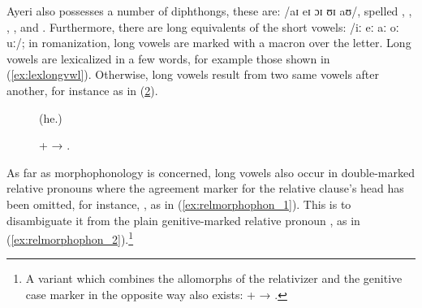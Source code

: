 Ayeri also possesses a number of diphthongs, these are: 
/aɪ eɪ ɔɪ ʊɪ aʊ/, spelled , , , , and 
. Furthermore, there are long equivalents of the short vowels: /iː eː 
aː oː uː/; in romanization, long vowels are marked with a macron 
 over the letter. Long vowels are lexicalized in a few words, for 
example those shown in (\ref{ex:lexlongvwl}). Otherwise, long vowels result
from two same vowels after another, for instance as in (\ref{ex:longvwls}).

\begin{figure}[h]
\pex\label{ex:lexlongvwl}
	\a {} 
	\a {} 
	\a {}
		 (he.\Aarg{})\label{ex:laa}
	\a {}
	\a {}\footnotemark
\xe
\end{figure}


\begin{figure}[h]
\ex\label{ex:longvwls}
	 +  → 
	.
\xe
\end{figure}

\label{doublerel}
As far as morphophonology is concerned, long vowels also
occur in double-marked relative pronouns where the agreement marker for the
relative clause's head has been omitted, for instance,
, as in (\ref{ex:relmorphophon_1}).
This is to disambiguate it from the plain genitive-marked relative pronoun
, as in (\ref{ex:relmorphophon_2}).\footnote{A
variant which combines the allomorphs of the relativizer and the genitive case
marker in the opposite way also exists:  +  →
.}

